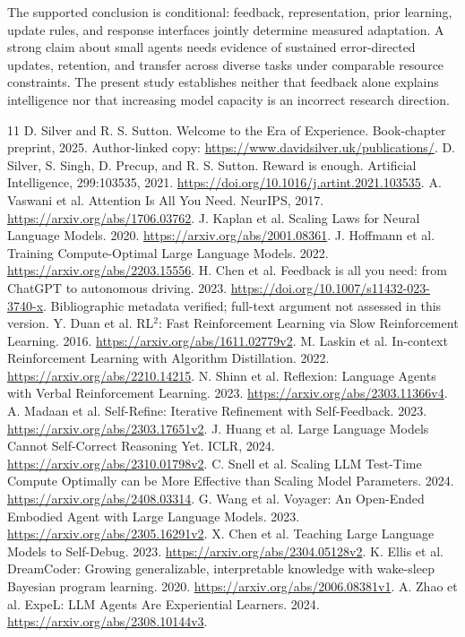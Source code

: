 \documentclass[11pt]{article}
\begin{document}
The supported conclusion is conditional: feedback, representation, prior
learning, update rules, and response interfaces jointly determine measured
adaptation. A strong claim about small agents needs evidence of sustained
error-directed updates, retention, and transfer across diverse tasks under
comparable resource constraints. The present study establishes neither that
feedback alone explains intelligence nor that increasing model capacity is an
incorrect research direction.

\begingroup\small
\begin{thebibliography}{11}
 D. Silver and R. S. Sutton. Welcome to the Era of Experience.
Book-chapter preprint, 2025. Author-linked copy:
\url{https://www.davidsilver.uk/publications/}.
 D. Silver, S. Singh, D. Precup, and R. S. Sutton.
Reward is enough. Artificial Intelligence, 299:103535, 2021.
\url{https://doi.org/10.1016/j.artint.2021.103535}.
 A. Vaswani et al. Attention Is All You Need. NeurIPS, 2017.
\url{https://arxiv.org/abs/1706.03762}.
 J. Kaplan et al. Scaling Laws for Neural Language Models. 2020.
\url{https://arxiv.org/abs/2001.08361}.
 J. Hoffmann et al. Training Compute-Optimal Large Language Models. 2022.
\url{https://arxiv.org/abs/2203.15556}.
 H. Chen et al. Feedback is all you need: from ChatGPT to autonomous driving. 2023.
\url{https://doi.org/10.1007/s11432-023-3740-x}. Bibliographic metadata verified;
full-text argument not assessed in this version.
 Y. Duan et al. RL$^2$: Fast Reinforcement Learning via Slow Reinforcement Learning. 2016.
\url{https://arxiv.org/abs/1611.02779v2}.
 M. Laskin et al. In-context Reinforcement Learning with Algorithm Distillation. 2022.
\url{https://arxiv.org/abs/2210.14215}.
 N. Shinn et al. Reflexion: Language Agents with Verbal Reinforcement Learning. 2023.
\url{https://arxiv.org/abs/2303.11366v4}.
 A. Madaan et al. Self-Refine: Iterative Refinement with Self-Feedback. 2023.
\url{https://arxiv.org/abs/2303.17651v2}.
 J. Huang et al. Large Language Models Cannot Self-Correct Reasoning Yet. ICLR, 2024.
\url{https://arxiv.org/abs/2310.01798v2}.
 C. Snell et al. Scaling LLM Test-Time Compute Optimally can be More Effective than Scaling Model Parameters. 2024.
\url{https://arxiv.org/abs/2408.03314}.
 G. Wang et al. Voyager: An Open-Ended Embodied Agent with Large Language Models. 2023.
\url{https://arxiv.org/abs/2305.16291v2}.
 X. Chen et al. Teaching Large Language Models to Self-Debug. 2023.
\url{https://arxiv.org/abs/2304.05128v2}.
 K. Ellis et al. DreamCoder: Growing generalizable,
interpretable knowledge with wake-sleep Bayesian program learning. 2020.
\url{https://arxiv.org/abs/2006.08381v1}.
 A. Zhao et al. ExpeL: LLM Agents Are Experiential Learners. 2024.
\url{https://arxiv.org/abs/2308.10144v3}.
\end{thebibliography}
\endgroup
\end{document}
